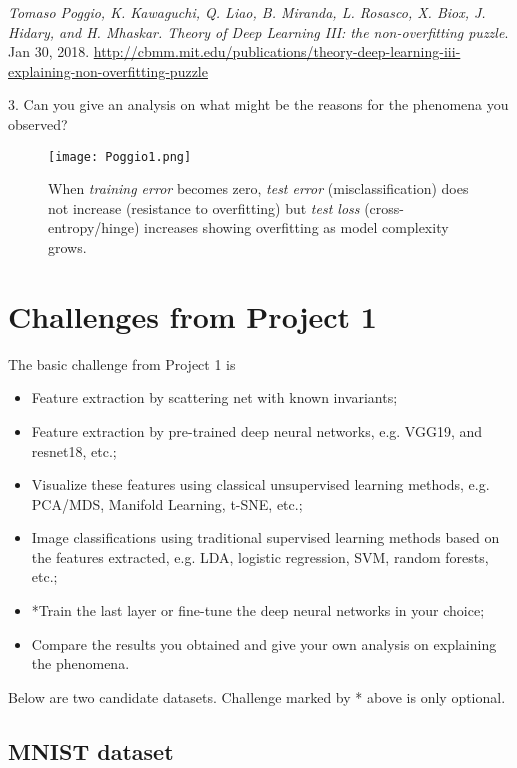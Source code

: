 \documentclass[11pt]{article}
\begin{document}
\emph{Tomaso Poggio, K. Kawaguchi, Q. Liao, B. Miranda, L. Rosasco, X. Biox, J. Hidary, and H. Mhaskar. Theory of Deep Learning III: the non-overfitting puzzle}. Jan 30, 2018. \url{http://cbmm.mit.edu/publications/theory-deep-learning-iii-explaining-non-overfitting-puzzle} 

3. Can you give an analysis on what might be the reasons for the phenomena you observed? 

\begin{figure}
\begin{centering}
\texttt{[image: Poggio1.png]}  
\caption{When \emph{training error} becomes zero, \emph{test error} (misclassification) does not increase (resistance to overfitting) but \emph{test loss} (cross-entropy/hinge) increases showing overfitting as model complexity grows.}
\label{fig:Poggio1}
\end{centering}
\end{figure}


\section{Challenges from Project 1}
The basic challenge from Project 1 is 
\begin{itemize}
\item Feature extraction by scattering net with known invariants; 
\item Feature extraction by pre-trained deep neural networks, e.g. VGG19, and resnet18, etc.;
\item Visualize these features using classical unsupervised learning methods, e.g. PCA/MDS, Manifold Learning, t-SNE, etc.; 
\item Image classifications using traditional supervised learning methods based on the features extracted, e.g. LDA, logistic regression, SVM, random forests, etc.;
\item *Train the last layer or fine-tune the deep neural networks in your choice; 
\item Compare the results you obtained and give your own analysis on explaining the phenomena.
\end{itemize}

Below are two candidate datasets. Challenge marked by * above is only optional. 

\subsection{MNIST dataset}
\end{document}

